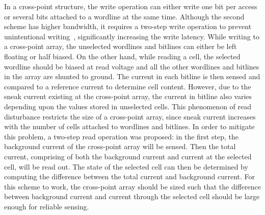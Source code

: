 In a cross-point structure, the write operation can either write one bit
per access or several bits attached to a wordline at the same time.
Although the second scheme has higher bandwidth, it requires a two-step
write operation to prevent unintentional writing~\cite{memristor:Cong},
significantly increasing the write latency.
While writing to a cross-point array, the unselected wordlines and
bitlines can either be left floating or half biased. On the other hand,
while reading a cell, the selected wordline should be biased at read
voltage and all the other wordlines and bitlines in the array are shunted to
ground. The current in each bitline is then sensed and compared to a
reference current to determine cell content. However, due to the sneak
current existing at the cross-point array, the current in bitline also
varies depending upon the values stored in unselected cells.
This phenomenon of read disturbance restricts the size of a cross-point
array, since sneak current increases with the number of cells attached to
wordlines and bitlines. In order to mitigate this problem, a two-step
read operation was proposed: in the first step, the background current of
the cross-point array  will be sensed. Then the total current, comprising
of both the background current and current at the selected cell, will be
read out. The state of the selected cell can then be determined by
computing the difference between the total current and background current.
For this scheme to work, the cross-point array should be sized such that
the difference between background current and current through the selected
cell should be large enough for reliable sensing.



